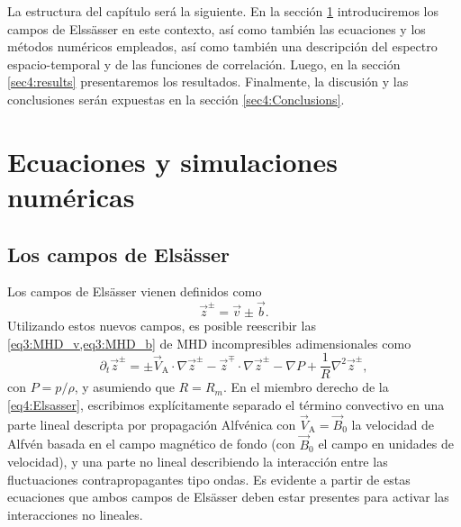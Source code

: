 La estructura del capítulo será la siguiente. En
la sección \ref{sec4:EqNumSim} introduciremos los campos de Elss\"asser en
este contexto, así como también las ecuaciones y los métodos numéricos
empleados, así como también una descripción del espectro
espacio-temporal y de las funciones de correlación. Luego, en
la sección \ref{sec4:results} presentaremos los resultados. Finalmente, la
discusión y las conclusiones serán expuestas en
la sección \ref{sec4:Conclusions}.

\section{Ecuaciones y simulaciones numéricas}\label{sec4:EqNumSim}

\subsection{Los campos de Els\"asser}\label{sec4:eq}
Los campos de Els\"asser vienen definidos como
\begin{equation}\label{eq4:MHD_zdef}
\vec{z}^\pm = \vec{v} \pm \vec{b} .
\end{equation}
Utilizando estos nuevos campos, es posible reescribir
las \cref{eq3:MHD_v,eq3:MHD_b} de MHD incompresibles adimensionales
como
\begin{equation}
\partial_t \vec{z}^\pm  = \pm  \vec{V}_\textrm{A} \cdot \nabla \vec{z}^\pm  - 
\vec{z}^\mp \cdot \nabla \vec{z}^\pm - \nabla{P} + 
\frac{1}{R} \nabla^2 \vec{z}^\pm ,
\label{eq4:Elsasser}
\end{equation}
con $P=p/\rho$, y asumiendo que $R=R_m$. En el miembro derecho de la
\cref{eq4:Elsasser}, escribimos explícitamente separado el término
convectivo en una parte lineal descripta por propagación Alfvénica con
$\vec{V}_\textrm{A} = \vec{B}_0$ la velocidad de Alfvén basada en el
campo magnético de fondo (con $\vec{B}_0$ el campo en unidades de
velocidad), y una parte no lineal describiendo la interacción entre
las fluctuaciones contrapropagantes tipo ondas. Es evidente a partir
de estas ecuaciones que ambos campos de Els\"asser deben estar
presentes para activar las interacciones no lineales.

